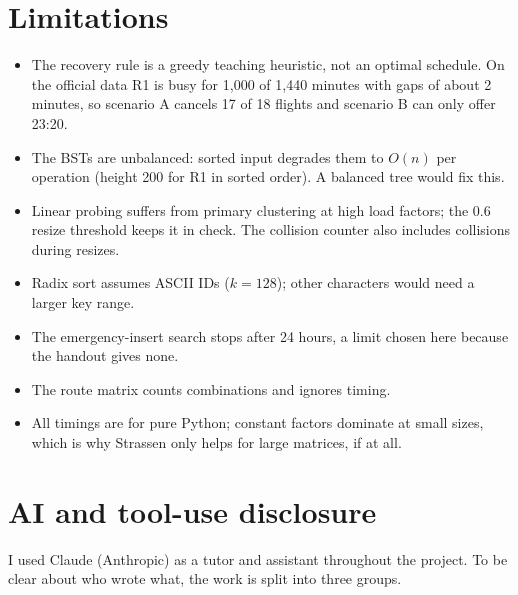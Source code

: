 \documentclass[11pt]{article}
\begin{document}
\section{Limitations}
\begin{itemize}
  \item The recovery rule is a greedy teaching heuristic, not an optimal
  schedule. On the official data R1 is busy for 1{,}000 of 1{,}440 minutes with
  gaps of about 2 minutes, so scenario A cancels 17 of 18 flights and
  scenario B can only offer 23:20.
  \item The BSTs are unbalanced: sorted input degrades them to $O(n)$ per
  operation (height 200 for R1 in sorted order). A balanced tree would fix this.
  \item Linear probing suffers from primary clustering at high load factors;
  the 0.6 resize threshold keeps it in check. The collision counter also
  includes collisions during resizes.
  \item Radix sort assumes ASCII IDs ($k = 128$); other characters would need
  a larger key range.
  \item The emergency-insert search stops after 24 hours, a limit chosen here
  because the handout gives none.
  \item The route matrix counts combinations and ignores timing.
  \item All timings are for pure Python; constant factors dominate at small
  sizes, which is why Strassen only helps for large matrices, if at all.
\end{itemize}

\section{AI and tool-use disclosure}

I used Claude (Anthropic) as a tutor and assistant throughout the project.
To be clear about who wrote what, the work is split into three groups.
\end{document}

